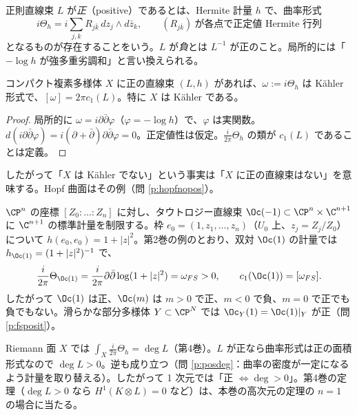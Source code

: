 \begin{defn}[正の直線束]\label{def:positive}
正則直線束 $L$ が\emph{正}（positive）であるとは、Hermite 計量 $h$ で、曲率形式
\[
i\Theta_h=i\sum_{j,k}R_{j\bar k}\,dz_j\wedge d\bar z_k,\qquad (R_{j\bar k})\ \text{が各点で正定値 Hermite 行列}
\]
となるものが存在することをいう。$L$ が\emph{負}とは $L^{-1}$ が正のこと。局所的には「$-\log h$ が強多重劣調和」と言い換えられる。
\end{defn}

\begin{prop}\label{prop:posKahler}\tP
コンパクト複素多様体 $X$ に正の直線束 $(L,h)$ があれば、$\omega:=i\Theta_h$ は Kähler 形式で、$[\omega]=2\pi c_1(L)$。特に $X$ は Kähler である。
\end{prop}
\begin{proof}
局所的に $\omega=i\partial\bar\partial\varphi$（$\varphi=-\log h$）で、$\varphi$ は実関数。$d(i\partial\bar\partial\varphi)=i(\partial+\bar\partial)\partial\bar\partial\varphi=0$。正定値性は仮定。$\frac i{2\pi}\Theta_h$ の類が $c_1(L)$ であることは定義。
\end{proof}
したがって「$X$ は Kähler でない」という事実は「$X$ に正の直線束はない」を意味する。Hopf 曲面はその例（問 \ref{p:hopfnopos}）。

\begin{ex}[$\Oc(1)$ は正]\label{ex:O1pos}
$\CP^n$ の座標 $[Z_0:\dots:Z_n]$ に対し、タウトロジー直線束 $\Oc(-1)\subset\CP^n\times\C^{n+1}$ に $\C^{n+1}$ の標準計量を制限する。枠 $e_0=(1,z_1,\dots,z_n)$（$U_0$ 上、$z_j=Z_j/Z_0$）について $h(e_0,e_0)=1+|z|^2$。第2巻の例のとおり、双対 $\Oc(1)$ の計量では $h_{\Oc(1)}=(1+|z|^2)^{-1}$ で、
\[
\frac i{2\pi}\Theta_{\Oc(1)}=\frac i{2\pi}\partial\bar\partial\log(1+|z|^2)=\omega_{FS}>0,\qquad c_1(\Oc(1))=[\omega_{FS}].
\]
したがって $\Oc(1)$ は正、$\Oc(m)$ は $m>0$ で正、$m<0$ で負、$m=0$ で正でも負でもない。滑らかな部分多様体 $Y\subset\CP^N$ では $\Oc_Y(1)=\Oc(1)|_Y$ が正（問 \ref{p:fsposit}）。
\end{ex}

\begin{ex}
Riemann 面 $X$ では $\int_X\frac i{2\pi}\Theta_h=\deg L$（第4巻）。$L$ が正なら曲率形式は正の面積形式なので $\deg L>0$。逆も成り立つ（問 \ref{p:posdeg}：曲率の密度が一定になるよう計量を取り替える）。したがって 1 次元では「正 $\iff\deg>0$」。第4巻の定理（$\deg L>0$ なら $H^1(K\otimes L)=0$ など）は、本巻の高次元の定理の $n=1$ の場合に当たる。
\end{ex}

